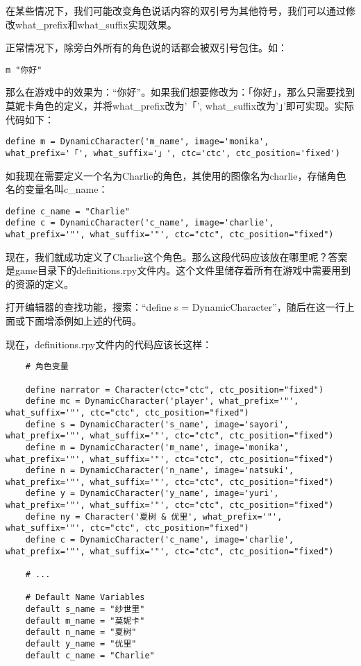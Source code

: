 \begin{ExtraKnowledge}
    在某些情况下，我们可能改变角色说话内容的双引号为其他符号，我们可以通过修改what\_prefix和what\_suffix实现效果。

    正常情况下，除旁白外所有的角色说的话都会被双引号包住。如：
    \begin{lstlisting}
m "你好"
    \end{lstlisting}

    那么在游戏中的效果为：“你好”。如果我们想要修改为：「你好」，那么只需要找到莫妮卡角色的定义，并将what\_prefix改为'「', what\_suffix改为'」'即可实现。实际代码如下：
    \begin{lstlisting}
define m = DynamicCharacter('m_name', image='monika', what_prefix='「', what_suffix='」', ctc='ctc', ctc_position='fixed')
    \end{lstlisting}
\end{ExtraKnowledge}

如我现在需要定义一个名为Charlie的角色，其使用的图像名为charlie，存储角色名的变量名叫c\_name：
\begin{lstlisting}
define c_name = "Charlie"
define c = DynamicCharacter('c_name', image='charlie', what_prefix='"', what_suffix='"', ctc="ctc", ctc_position="fixed")
\end{lstlisting}

现在，我们就成功定义了Charlie这个角色。那么这段代码应该放在哪里呢？答案是game目录下的definitions.rpy文件内。这个文件里储存着所有在游戏中需要用到的资源的定义。

打开编辑器的查找功能，搜索：“define s = DynamicCharacter”，随后在这一行上面或下面增添例如上述的代码。

现在，definitions.rpy文件内的代码应该长这样：
\begin{lstlisting}
    # 角色变量

    define narrator = Character(ctc="ctc", ctc_position="fixed")
    define mc = DynamicCharacter('player', what_prefix='"', what_suffix='"', ctc="ctc", ctc_position="fixed")
    define s = DynamicCharacter('s_name', image='sayori', what_prefix='"', what_suffix='"', ctc="ctc", ctc_position="fixed")
    define m = DynamicCharacter('m_name', image='monika', what_prefix='"', what_suffix='"', ctc="ctc", ctc_position="fixed")
    define n = DynamicCharacter('n_name', image='natsuki', what_prefix='"', what_suffix='"', ctc="ctc", ctc_position="fixed")
    define y = DynamicCharacter('y_name', image='yuri', what_prefix='"', what_suffix='"', ctc="ctc", ctc_position="fixed")
    define ny = Character('夏树 & 优里', what_prefix='"', what_suffix='"', ctc="ctc", ctc_position="fixed")
    define c = DynamicCharacter('c_name', image='charlie', what_prefix='"', what_suffix='"', ctc="ctc", ctc_position="fixed")
    
    # ...
    
    # Default Name Variables
    default s_name = "纱世里"
    default m_name = "莫妮卡"
    default n_name = "夏树"
    default y_name = "优里"
    default c_name = "Charlie"
    
    
\end{lstlisting}


